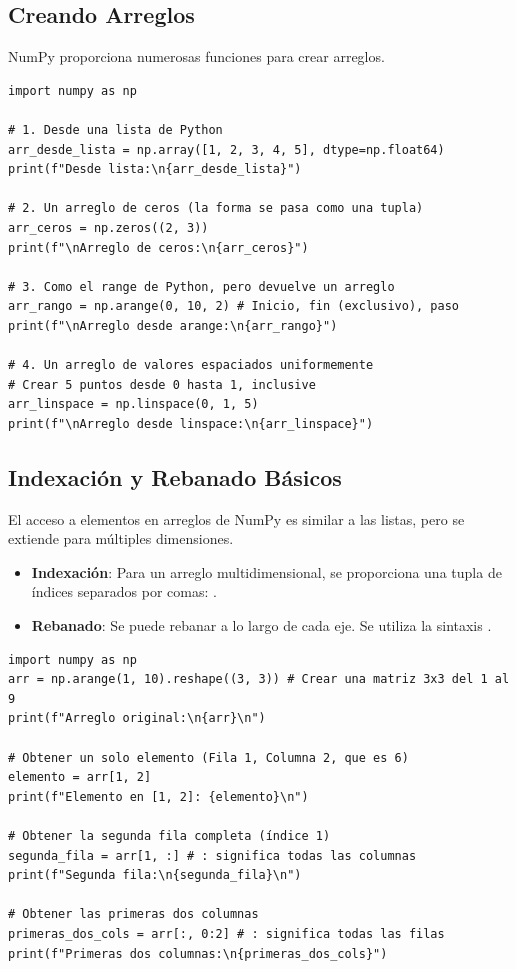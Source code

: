 \subsection{Creando Arreglos}
\label{subsec:numpy_creation}
NumPy proporciona numerosas funciones para crear arreglos.
\text{ }\begin{verbatim}
import numpy as np

# 1. Desde una lista de Python
arr_desde_lista = np.array([1, 2, 3, 4, 5], dtype=np.float64)
print(f"Desde lista:\n{arr_desde_lista}")

# 2. Un arreglo de ceros (la forma se pasa como una tupla)
arr_ceros = np.zeros((2, 3))
print(f"\nArreglo de ceros:\n{arr_ceros}")

# 3. Como el range de Python, pero devuelve un arreglo
arr_rango = np.arange(0, 10, 2) # Inicio, fin (exclusivo), paso
print(f"\nArreglo desde arange:\n{arr_rango}")

# 4. Un arreglo de valores espaciados uniformemente
# Crear 5 puntos desde 0 hasta 1, inclusive
arr_linspace = np.linspace(0, 1, 5)
print(f"\nArreglo desde linspace:\n{arr_linspace}")
\end{verbatim}

\subsection{Indexación y Rebanado Básicos}
\label{subsec:numpy_indexing}
El acceso a elementos en arreglos de NumPy es similar a las listas, pero se extiende para múltiples dimensiones.
\begin{itemize}
    \item \textbf{Indexación}: Para un arreglo multidimensional, se proporciona una tupla de índices separados por comas: .
    \item \textbf{Rebanado}: Se puede rebanar a lo largo de cada eje. Se utiliza la sintaxis .
\end{itemize}

\begin{example}
\text{ }\begin{verbatim}
import numpy as np
arr = np.arange(1, 10).reshape((3, 3)) # Crear una matriz 3x3 del 1 al 9
print(f"Arreglo original:\n{arr}\n")

# Obtener un solo elemento (Fila 1, Columna 2, que es 6)
elemento = arr[1, 2]
print(f"Elemento en [1, 2]: {elemento}\n")

# Obtener la segunda fila completa (índice 1)
segunda_fila = arr[1, :] # : significa todas las columnas
print(f"Segunda fila:\n{segunda_fila}\n")

# Obtener las primeras dos columnas
primeras_dos_cols = arr[:, 0:2] # : significa todas las filas
print(f"Primeras dos columnas:\n{primeras_dos_cols}")
\end{verbatim}
\end{example}


